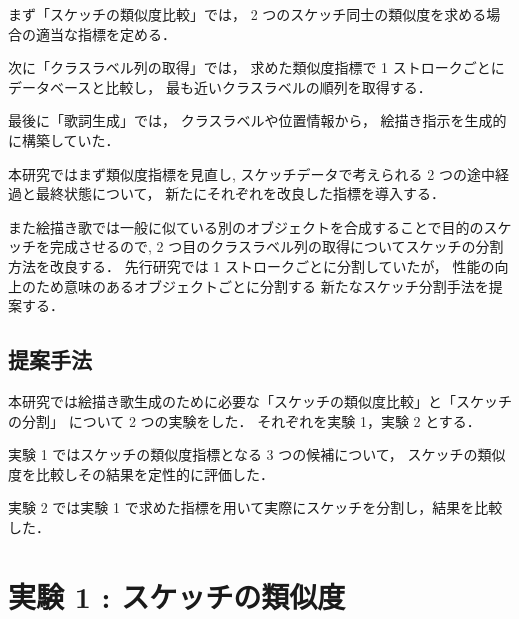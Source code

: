 \documentclass[twocolumn]{jarticle}     %
\begin{document}
まず「スケッチの類似度比較」では，
2 つのスケッチ同士の類似度を求める場合の適当な指標を定める．

次に「クラスラベル列の取得」では，
求めた類似度指標で 1 ストロークごとにデータベースと比較し，
最も近いクラスラベルの順列を取得する．

最後に「歌詞生成」では，
クラスラベルや位置情報から，
絵描き指示を生成的に構築していた．

本研究ではまず類似度指標を見直し,
スケッチデータで考えられる 2 つの途中経過と最終状態について，
新たにそれぞれを改良した指標を導入する．

また絵描き歌では一般に似ている別のオブジェクトを合成することで目的のスケッチを完成させるので,
2 つ目のクラスラベル列の取得についてスケッチの分割方法を改良する．
先行研究では 1 ストロークごとに分割していたが，
性能の向上のため意味のあるオブジェクトごとに分割する
新たなスケッチ分割手法を提案する．


\subsection{提案手法}
本研究では絵描き歌生成のために必要な「スケッチの類似度比較」と「スケッチの分割」
について 2 つの実験をした．
それぞれを実験 1，実験 2 とする．

実験 1 ではスケッチの類似度指標となる 3 つの候補について，
スケッチの類似度を比較しその結果を定性的に評価した．

実験 2 では実験 1 で求めた指標を用いて実際にスケッチを分割し，結果を比較した．


\section{実験 1 : スケッチの類似度}
\end{document}
